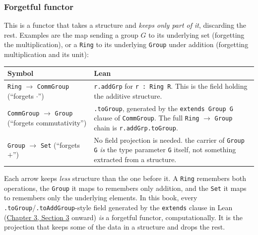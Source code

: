 \subsubsection{Forgetful functor}\label{sec:02-terminology-and-coc:01-terminology:9}

This is a functor that takes a structure and \emph{keeps only part of it}, discarding the rest. Examples are the map sending a group \(G\) to its underlying set (forgetting the multiplication), or a \texttt{Ring} to its underlying \texttt{Group} under addition (forgetting multiplication and its unit):

\begin{center}

\end{center}

\begin{longtable}[]{@{}
  >{\raggedright\arraybackslash}p{}
  >{\raggedright\arraybackslash}p{}@{}}
\toprule\noalign{}
\begin{minipage}[b]{\linewidth}\raggedright
Symbol
\end{minipage} & \begin{minipage}[b]{\linewidth}\raggedright
Lean
\end{minipage} \\
\midrule\noalign{}
\endhead
\bottomrule\noalign{}
\endlastfoot
\texttt{Ring} \(\to\) \texttt{CommGroup} (``forgets \(\cdot\)'') & \texttt{r.addGrp} for \texttt{r : Ring R}. This is the field holding the additive structure. \\
\texttt{CommGroup} \(\to\) \texttt{Group} (``forgets commutativity'') & \texttt{.toGroup}, generated by the \texttt{extends Group G} clause of \texttt{CommGroup}. The full \texttt{Ring} \(\to\) \texttt{Group} chain is \texttt{r.addGrp.toGroup}. \\
\texttt{Group} \(\to\) \texttt{Set} (``forgets \(+\)'') & No field projection is needed. the carrier of \texttt{Group G} \emph{is} the type parameter \texttt{G} itself, not something extracted from a structure. \\
\end{longtable}

Each arrow keeps \emph{less} structure than the one before it. A \texttt{Ring} remembers both operations, the \texttt{Group} it maps to remembers only addition, and the \texttt{Set} it maps to remembers only the underlying elements. In this book, every \texttt{.toGroup}/\texttt{.toAddGroup}-style field generated by the \texttt{extends} clause in Lean (\hyperref[sec:03-functions-and-structures:03-extending-structures:1]{Chapter 3, Section 3} onward) \emph{is} a forgetful functor, computationally. It is the projection that keeps some of the data in a structure and drops the rest.

